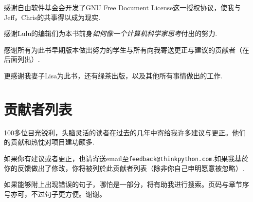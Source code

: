 感谢自由软件基金会开发了GNU Free Document License这一授权协议，使我与Jeff，Chris的共事得以成为现实.


感谢Lulu的编辑们为本书前身{\em 如何像一个计算机科学家思考}付出的努力.

感谢所有为此书早期版本做出努力的学生与所有向我寄送更正与建议的贡献者（在后面列出）.

更感谢我妻子Lisa为此书，还有绿茶出版，以及其他所有事情做出的工作.

\section*{贡献者列表}


100多位目光锐利，头脑灵活的读者在过去的几年中寄给我许多建议与更正。他们的贡献和热忱对项目建功颇多.

如果你有建议或者更正，也请寄送email至{\tt feedback@thinkpython.com}.如果我基於你的反馈做出了修改，你将被列於此贡献者列表（除非你自己申明愿意被忽略）.

如果能够附上出现错误的句子，哪怕是一部分，将有助我进行搜索。页码与章节序号亦可，不过句子更方便。谢谢。

\small

